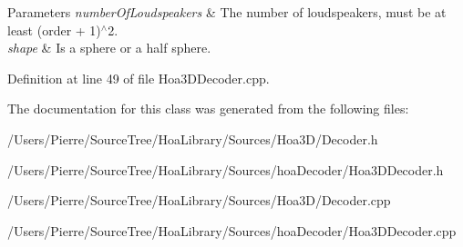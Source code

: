 \begin{DoxyParams}{Parameters}
{\em number\-Of\-Loudspeakers} & The number of loudspeakers, must be at least (order + 1)$^\wedge$2. \\
\hline
{\em shape} & Is a sphere or a half sphere. \\
\hline
\end{DoxyParams}


Definition at line 49 of file Hoa3\-D\-Decoder.\-cpp.



The documentation for this class was generated from the following files\-:\begin{DoxyCompactItemize}
\item 
/\-Users/\-Pierre/\-Source\-Tree/\-Hoa\-Library/\-Sources/\-Hoa3\-D/Decoder.\-h\item 
/\-Users/\-Pierre/\-Source\-Tree/\-Hoa\-Library/\-Sources/hoa\-Decoder/Hoa3\-D\-Decoder.\-h\item 
/\-Users/\-Pierre/\-Source\-Tree/\-Hoa\-Library/\-Sources/\-Hoa3\-D/Decoder.\-cpp\item 
/\-Users/\-Pierre/\-Source\-Tree/\-Hoa\-Library/\-Sources/hoa\-Decoder/Hoa3\-D\-Decoder.\-cpp\end{DoxyCompactItemize}
